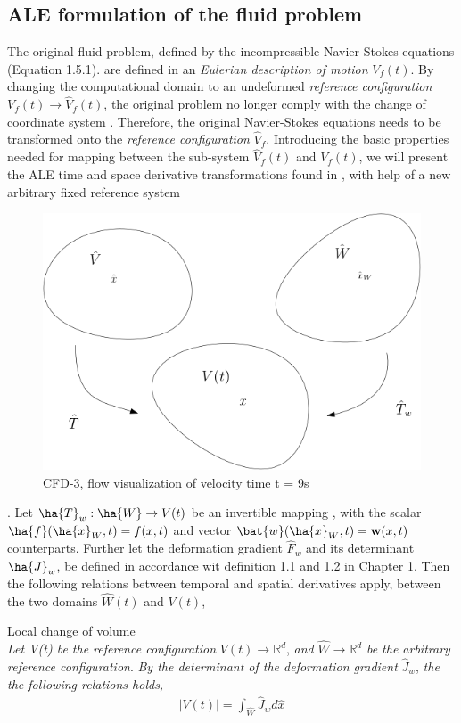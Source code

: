 \subsection{ALE formulation of the fluid problem}
The original fluid problem, defined by the incompressible Navier-Stokes equations (Equation 1.5.1). are defined in an \textit{Eulerian description of motion} $V_f (t)$. By changing the computational domain to an undeformed \textit{reference configuration} $V_f (t) \rightarrow \hat{V}_f (t)$, the original problem no longer comply with the change of coordinate system . Therefore,  the original Navier-Stokes equations needs to be transformed onto the  \textit{reference configuration} $\hat{V}_f $.
Introducing the basic properties needed for mapping between the sub-system $\hat{V}_f (t)$ and $V_f (t)$, we will present the ALE  time and space derivative transformations found in \cite{Richter2016}, with help of a new arbitrary fixed reference system  
\begin{figure}[h!]
  \centering
    \includegraphics[scale=0.5]{./Fig/wdom.png}
      \caption{CFD-3, flow visualization of velocity time t = 9s}
\end{figure}
. Let $\ha{T}_w : \ha{W} \rightarrow V(t)$ be an invertible mapping , with the scalar $\ha{f}(\ha{x}_W, t) = f(x,t) $ and vector $\bat{w}(\ha{x}_W, t) = \mathbf{w}(x,t) $ counterparts. Further let the deformation gradient $\hat{F}_w$ and its determinant $\ha{J}_w$, be defined in accordance wit definition 1.1 and 1.2 in Chapter 1. Then the following relations between temporal and spatial derivatives apply, between the two domains $\hat{W} (t)$ and $V (t)$,
\begin{lem}
Local change of volume \\
\textit{Let V(t) be the reference configuration} $V(t) \rightarrow \mathbb{R}^d$, \textit{and} $\hat{W}  \rightarrow \mathbb{R}^d$ \textit{be the arbitrary reference configuration}. \textit{By the determinant of the deformation gradient} $\hat{J}_w$, \textit{the the following relations holds,}
\begin{align}
|V(t)| = \int_{\hat{W}} \hat{J}_w d \hat{x}
\end{align} 
\end{lem}
